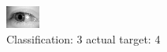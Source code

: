 \begin{figure}[h!]
\begin{center}
\includegraphics[width=0.60\columnwidth]{figures/ID3270_class_3_target_4.png}
\end{center}
\caption{ Classification: 3 actual target: 4}
\label{fig:ID3270_class_3_target_4}
\end{figure}
